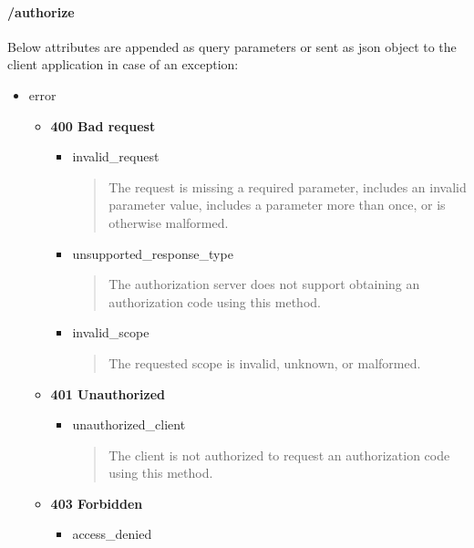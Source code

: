 \documentclass[letterpaper,10pt,english]{sphinxmanual}
\begin{document}
\paragraph{/authorize}
\label{features/oauth2/error_responses:authorize}
Below attributes are appended as query parameters or sent as json object to the client application in case of an exception:
\begin{itemize}
\item {} 
error
\begin{itemize}
\item {} 
\textbf{400 Bad request}
\begin{itemize}
\item {} 
invalid\_request
\begin{quote}

The request is missing a required parameter, includes an invalid parameter value, includes a parameter more than once,
or is otherwise malformed.
\end{quote}

\item {} 
unsupported\_response\_type
\begin{quote}

The authorization server does not support obtaining an authorization code using this method.
\end{quote}

\item {} 
invalid\_scope
\begin{quote}

The requested scope is invalid, unknown, or malformed.
\end{quote}

\end{itemize}

\item {} 
\textbf{401 Unauthorized}
\begin{itemize}
\item {} 
unauthorized\_client
\begin{quote}

The client is not authorized to request an authorization code using this method.
\end{quote}

\end{itemize}

\item {} 
\textbf{403 Forbidden}
\begin{itemize}
\item {} 
access\_denied
\begin{quote}


\end{quote}
\end{itemize}
\end{itemize}
\end{itemize}
\end{document}
